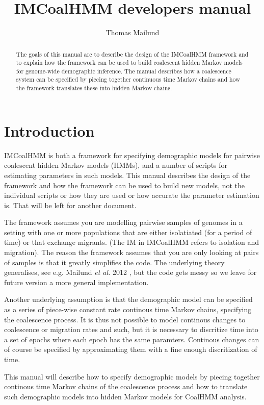 \documentclass[11pt]{article}
\title{IMCoalHMM developers manual}
\author{Thomas Mailund}
\begin{document}
\maketitle

\begin{abstract}
    The goals of this manual are to describe the design of the IMCoalHMM framework and to explain how the framework can be used to build coalescent hidden Markov models for genome-wide demographic inference. The manual describes how a coalescence system can be specified by piecing together continuous time Markov chains and how the framework translates these into hidden Markov chains.
\end{abstract}

\section{Introduction}

IMCoalHMM is both a framework for specifying demographic models for pairwise coalescent hidden Markov models (HMMs), and a number of scripts for estimating parameters in such models. This manual describes the design of the framework and how the framework can be used to build new models, not the individual scripts or how they are used or how accurate the parameter estimation is. That will be left for another document.

The framework assumes you are modelling pairwise samples of genomes in a setting with one or more populations that are either isolatiated (for a period of time) or that exchange migrants. (The IM in IMCoalHMM refers to isolation and migration). The reason the framework assumes that you are only looking at pairs of samples is that it greatly simplifies the code. The underlying theory generalises, see e.g. Mailund \emph{et al.} 2012 \cite{springerlink:10.1007/978-3-642-31131-4_3}, but the code gets messy so we leave for future version a more general implementation.

Another underlying assumption is that the demographic model can be specified as a series of piece-wise constant rate continous time Markov chains, specifying the coalescence process. It is thus not possible to model continous changes to coalescence or migration rates and such, but it is necessary to discritize time into a set of epochs where each epoch has the same paramters. Continous changes can of course be specified by approximating them with a fine enough discritization of time.

This manual will describe how to specify demographic models by piecing together continous time Markov chains of the coalescence process and how to translate such demographic models into hidden Markov models for CoalHMM analysis.
\end{document}
